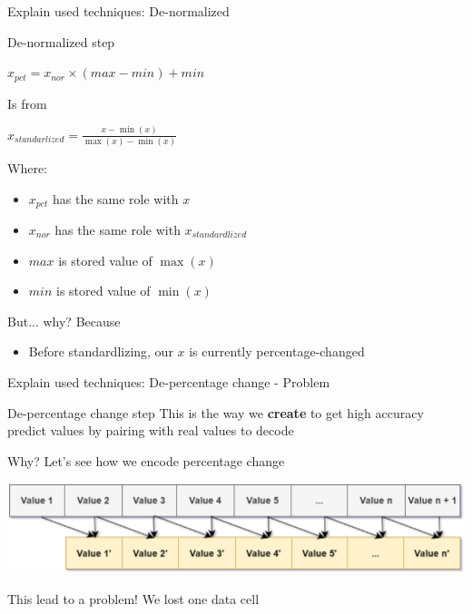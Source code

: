 \documentclass[compress, mathserif, fleqn, 10pt]{beamer}
\begin{document}
	\begin{frame}{Explain used techniques: De-normalized}
		\begin{block}{De-normalized step}
			\centerline{$x_{pct}=x_{nor}\times(max-min)+min \label{de-nor}$}
			\bigskip
			
			\centerline{Is from}
			
			\bigskip
			\centerline{$x_{standarlized}=\frac{x-\min (x)}{\max (x)-\min (x)}$}
			
			\smallskip
			Where:
			
			\begin{itemize}
				\item $x_{pct}$ has the same role with $x$
				
				\item $x_{nor}$ has the same role with $x_{standardlized}$
				
				\item $max$ is stored value of $\max(x)$
				
				\item $min$ is stored value of $\min(x)$
			\end{itemize}
		\end{block}
		
		\begin{exampleblock}{But... why?}
			Because
			\begin{itemize}
				\item Before standardlizing, our $x$ is currently percentage-changed
			\end{itemize}
		\end{exampleblock}
	\end{frame}
	
	\begin{frame}{Explain used techniques: De-percentage change - Problem}
		\begin{block}{De-percentage change step}
			This is the way we \textbf{create} to get high accuracy predict values by
			pairing with real values to decode
			
			Why? Let's see how we encode percentage change
		\end{block}
		\smallskip
		\centerline{\includegraphics[width=\textwidth]{images/enc_percent.eps}}
		\bigskip
		\begin{exampleblock}{This lead to a problem!}
			We lost one data cell
		\end{exampleblock}
	\end{frame}
	
\end{document}
